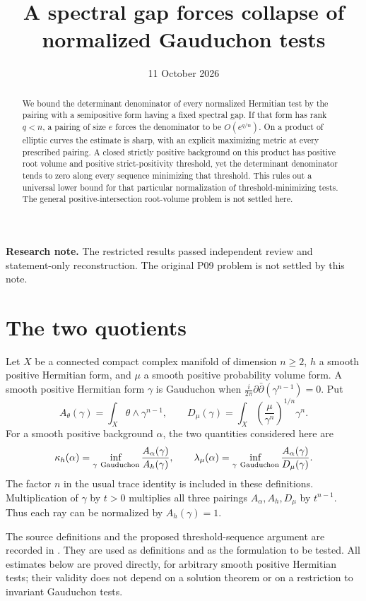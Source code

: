 \documentclass[11pt]{article}
\title{A spectral gap forces collapse of normalized Gauduchon tests}
\author{}
\date{11 October 2026}
\newcommand{\ddc}{\frac{i}{2\pi}\partial\bar\partial}
\begin{document}
\maketitle
\noindent\textbf{Research note.}
The restricted results passed independent review and statement-only
reconstruction. The original P09 problem is not settled by this note.

\begin{abstract}
We bound the determinant denominator of every normalized Hermitian test
by the pairing with a semipositive form having a fixed spectral gap.
If that form has rank \(q<n\), a pairing of size \(e\) forces the denominator
to be \(O(e^{q/n})\). On a product of elliptic curves the estimate is sharp,
with an explicit maximizing metric at every prescribed pairing.
A closed strictly positive background on this product has positive root
volume and positive strict-positivity threshold, yet the determinant
denominator tends to zero along every sequence minimizing that threshold.
This rules out a universal lower bound for that particular normalization
of threshold-minimizing tests. The general positive-intersection
root-volume problem is not settled here.
\end{abstract}

\section{The two quotients}

Let \(X\) be a connected compact complex manifold of dimension \(n\geq2\),
\(h\) a smooth positive Hermitian form, and \(\mu\) a smooth positive
probability volume form. A smooth positive Hermitian form \(\gamma\) is
Gauduchon when \(\ddc(\gamma^{n-1})=0\). Put
\[
 A_\theta(\gamma)=\int_X\theta\wedge\gamma^{n-1},
 \qquad
 D_\mu(\gamma)=\int_X
       \left(\frac{\mu}{\gamma^n}\right)^{1/n}\gamma^n .
\]
For a smooth positive background \(\alpha\), the two quantities considered
here are
\[
 \kappa_h(\alpha)=\inf_{\gamma\ {\rm Gauduchon}}
       \frac{A_\alpha(\gamma)}{A_h(\gamma)},
 \qquad
 \lambda_\mu(\alpha)=\inf_{\gamma\ {\rm Gauduchon}}
       \frac{A_\alpha(\gamma)}{D_\mu(\gamma)}.
\]
The factor \(n\) in the usual trace identity is included in these
definitions. Multiplication of \(\gamma\) by \(t>0\) multiplies
all three pairings \(A_\alpha,A_h,D_\mu\) by \(t^{n-1}\).
Thus each ray can be normalized by \(A_h(\gamma)=1\).

The source definitions and the proposed threshold-sequence argument
are recorded in \cite{volume,collapse,bridge}. They are used as definitions
and as the formulation to be tested. All estimates below are proved
directly, for arbitrary smooth positive Hermitian tests; their validity
does not depend on a solution theorem or on a restriction to invariant
Gauduchon tests.
\end{document}
